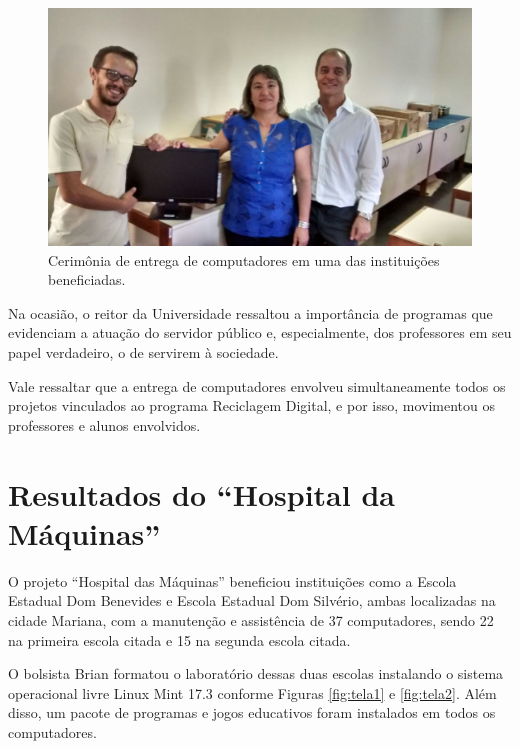 \documentclass[
	12pt,				%
	openright,			%
	oneside,			%
	a4paper,			%
	english,			%
	spanish,			%
	brazil,				%
	]{abntex2}
\begin{document}
\begin{figure}[H]
	\centering
	\includegraphics[scale=0.3]{figuras/cerimonia-de-entrega.pdf}
	\caption{Cerimônia de entrega de computadores em uma das instituições beneficiadas.}  \label{fig:entrega} 
\end{figure}

Na ocasião, o reitor da Universidade ressaltou a importância de programas que evidenciam a atuação do servidor público e, especialmente, dos professores em seu papel verdadeiro, o de servirem à sociedade.

Vale ressaltar que a entrega de computadores envolveu simultaneamente todos os projetos vinculados ao programa Reciclagem Digital, e por isso, movimentou os professores e alunos envolvidos.


\section{Resultados do ``Hospital da Máquinas''}

O projeto ``Hospital das Máquinas'' beneficiou instituições como a Escola Estadual Dom Benevides e Escola Estadual Dom Silvério, ambas localizadas na cidade Mariana, com a manutenção e assistência de 37 computadores, sendo 22 na primeira escola citada e 15 na segunda escola citada.

O bolsista Brian formatou o laboratório dessas duas escolas instalando o sistema operacional livre Linux Mint 17.3 conforme Figuras \ref{fig:tela1} e \ref{fig:tela2}. Além disso, um pacote de programas e jogos educativos foram instalados em todos os computadores. 
\end{document}
